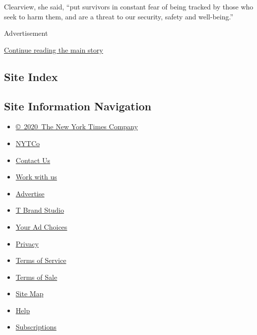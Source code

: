 Clearview, she said, ``put survivors in constant fear of being tracked
by those who seek to harm them, and are a threat to our security, safety
and well-being.''

Advertisement

\protect\hyperlink{after-bottom}{Continue reading the main story}

\hypertarget{site-index}{%
\subsection{Site Index}\label{site-index}}

\hypertarget{site-information-navigation}{%
\subsection{Site Information
Navigation}\label{site-information-navigation}}

\begin{itemize}
\tightlist
\item
  \href{https://help.nytimes3xbfgragh.onion/hc/en-us/articles/115014792127-Copyright-notice}{©~2020~The
  New York Times Company}
\end{itemize}

\begin{itemize}
\tightlist
\item
  \href{https://www.nytco.com/}{NYTCo}
\item
  \href{https://help.nytimes3xbfgragh.onion/hc/en-us/articles/115015385887-Contact-Us}{Contact
  Us}
\item
  \href{https://www.nytco.com/careers/}{Work with us}
\item
  \href{https://nytmediakit.com/}{Advertise}
\item
  \href{http://www.tbrandstudio.com/}{T Brand Studio}
\item
  \href{https://www.nytimes3xbfgragh.onion/privacy/cookie-policy\#how-do-i-manage-trackers}{Your
  Ad Choices}
\item
  \href{https://www.nytimes3xbfgragh.onion/privacy}{Privacy}
\item
  \href{https://help.nytimes3xbfgragh.onion/hc/en-us/articles/115014893428-Terms-of-service}{Terms
  of Service}
\item
  \href{https://help.nytimes3xbfgragh.onion/hc/en-us/articles/115014893968-Terms-of-sale}{Terms
  of Sale}
\item
  \href{https://spiderbites.nytimes3xbfgragh.onion}{Site Map}
\item
  \href{https://help.nytimes3xbfgragh.onion/hc/en-us}{Help}
\item
  \href{https://www.nytimes3xbfgragh.onion/subscription?campaignId=37WXW}{Subscriptions}
\end{itemize}
